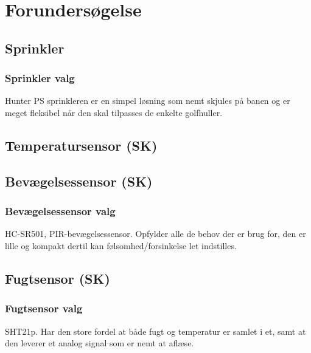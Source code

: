 \chapter{Forundersøgelse}

\section{Sprinkler}								%

\subsection{Sprinkler valg}						%
Hunter PS sprinkleren er en simpel løsning som nemt skjules på banen og er meget fleksibel når den skal tilpasses de enkelte golfhuller.
\clearpage
\section{Temperatursensor (SK)}						



\section{Bevægelsessensor (SK)}						

\subsection{Bevægelsessensor valg}				%
HC-SR501, PIR-bevægelsessensor. Opfylder alle de behov der er brug for, den er lille og kompakt dertil kan følsomhed/forsinkelse let indstilles.

\clearpage
\section{Fugtsensor (SK)}						

\subsection{Fugtsensor valg}						%
SHT21p. Har den store fordel at både fugt og temperatur er samlet i et, samt at den leverer et analog signal som er nemt at aflæse. 